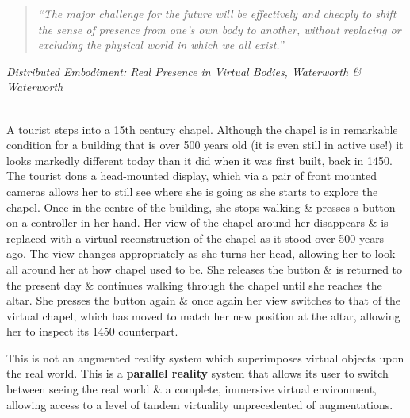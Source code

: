 \begin{quote}
	\textit{``The major challenge for the future will be effectively and cheaply to shift the sense of presence from one's own body to another, without replacing or excluding the physical world in which we all exist.''}
\end{quote}
\hfill \textit{Distributed Embodiment: Real Presence in Virtual Bodies, Waterworth \& Waterworth}
\\
\\

\label{introduction}


A tourist steps into a 15th century chapel. Although the chapel is in remarkable condition for a building that is over 500 years old (it is even still in active use!) it looks markedly different today than it did when it was first built, back in 1450. The tourist dons a head-mounted display, which via a pair of front mounted cameras allows her to still see where she is going as she starts to explore the chapel. Once in the centre of the building, she stops walking \& presses a button on a controller in her hand. Her view of the chapel around her disappears \& is replaced with a virtual reconstruction of the chapel as it stood over 500 years ago. The view changes appropriately as she turns her head, allowing her to look all around her at how chapel used to be. She releases the button \& is returned to the present day \& continues walking through the chapel until she reaches the altar. She presses the button again \& once again her view switches to that of the virtual chapel, which has moved to match her new position at the altar, allowing her to inspect its 1450 counterpart.

This is not an augmented reality system which superimposes virtual objects upon the real world. This is a \textbf{parallel reality} system that allows its user to switch between seeing the real world \& a complete, immersive virtual environment, allowing access to a level of tandem virtuality unprecedented of augmentations.


